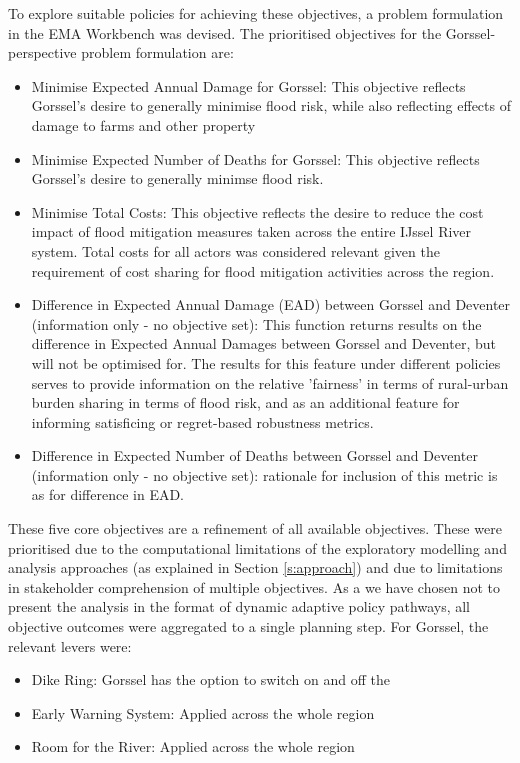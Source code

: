 To explore suitable policies for achieving these objectives, a problem formulation in the EMA Workbench was devised.
The prioritised objectives for the Gorssel-perspective problem formulation are:
\begin{itemize}
    \item Minimise Expected Annual Damage for Gorssel: This objective reflects Gorssel's desire to generally minimise flood risk, while also reflecting effects of damage to farms and other property
    \item Minimise Expected Number of Deaths for Gorssel: This objective reflects Gorssel's desire to generally minimse flood risk.
    \item Minimise Total Costs: This objective reflects the desire to reduce the cost impact of flood mitigation measures taken across the entire IJssel River system. Total costs for all actors was considered relevant given the requirement of cost sharing for flood mitigation activities across the region.
    \item Difference in Expected Annual Damage (EAD) between Gorssel and Deventer (information only - no objective set): This function returns results on the difference in Expected Annual Damages between Gorssel and Deventer, but will not be optimised for. The results for this feature under different policies serves to provide information on the relative 'fairness' in terms of rural-urban burden sharing in terms of flood risk, and as an additional feature for informing satisficing or regret-based robustness metrics.
    \item Difference in Expected Number of Deaths between Gorssel and Deventer (information only - no objective set): rationale for inclusion of this metric is as for difference in EAD.
\end{itemize}
These five core objectives are a refinement of all available objectives. These were prioritised due to the computational limitations of the exploratory modelling and analysis approaches (as explained in Section \ref{s:approach}) and due to limitations in stakeholder comprehension of multiple objectives. As a we have chosen not to present the analysis in the format of dynamic adaptive policy pathways, all objective outcomes were aggregated to a single planning step. 
For Gorssel, the relevant levers were:
\begin{itemize}
    \item Dike Ring: Gorssel has the option to switch on and off the 
    \item Early Warning System: Applied across the whole region
    \item Room for the River: Applied across the whole region
\end{itemize}

